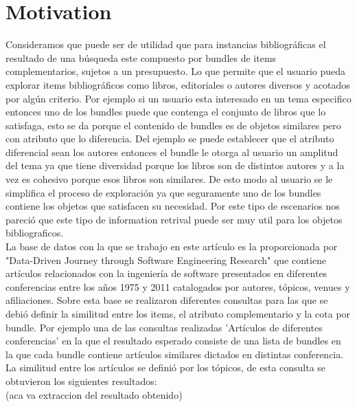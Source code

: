 \section{Motivation}
Consideramos que puede ser de utilidad que para instancias bibliográficas el resultado de una búsqueda este compuesto por bundles de items complementarios, sujetos a un presupuesto. 
Lo que permite que el usuario pueda explorar items bibliográficos como libros, editoriales o autores diversos y acotados por algún criterio. Por ejemplo si un usuario esta interesado en un tema especifico entonces uno de los bundles puede que contenga el conjunto de libros que lo satisfaga, esto se da porque el contenido de bundles es de objetos similares pero con atributo que lo diferencia. Del ejemplo se puede establecer que el atributo diferencial sean los autores entonces el bundle le otorga al usuario un amplitud del tema ya que tiene diversidad porque los libros son de distintos autores y a la vez es cohesivo porque esos libros son similares. De esto modo al usuario se le simplifica el proceso de exploración ya que seguramente uno de los bundles contiene los objetos que satisfacen su necesidad. Por este tipo de escenarios nos pareció que este tipo de information retrival puede ser muy util para los objetos bibliograficos.   \\
La base de datos con la que se trabajo en este artículo es la proporcionada por "Data-Driven Journey through Software Engineering Research" que contiene artículos relacionados con la ingeniería de software presentados en diferentes conferencias entre los años 1975 y 2011 catalogados por autores, tópicos, venues y afiliaciones. Sobre esta base se realizaron diferentes consultas para las que se debió definir la similitud entre los items, el atributo complementario y la cota por bundle. Por ejemplo una de las consultas realizadas 'Artículos de diferentes conferencias'
en la que el resultado esperado consiste de una lista de bundles en la que cada bundle contiene artículos similares dictados en distintas conferencia. La similitud entre los artículos se definió por los tópicos, de esta consulta se obtuvieron los siguientes resultados:\\
(aca va extraccion del resultado obtenido)